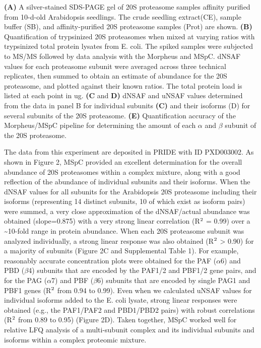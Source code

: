 \begin{FPfigure}
	{\textbf{(A)} A silver-stained SDS-PAGE gel of 20S proteasome samples affinity purified from 10-d-old Arabidopsis seedlings. The crude seedling extract(CE), sample buffer (SB), and affinity-purified 20S proteasome samples (Prot) are shown. \textbf{(B)} Quantification of trypsinized 20S proteasomes when mixed at varying ratios with trypsinized total protein lysates from E. coli. The spiked samples were subjected to MS/MS followed by data analysis with the Morpheus and MSpC. dNSAF values for each proteasome subunit were averaged across three technical replicates, then summed to obtain an estimate of abundance for the 20S proteasome, and plotted against their known ratios. The total protein load is listed at each point in ug. \textbf{(C} and \textbf{D)} dNSAF and uNSAF values determined from the data in panel B for individual subunits \textbf{(C)} and their isoforms {(D)} for several subunits of the 20S proteasome. \textbf{(E)} Quantification accuracy of the Morpheus/MSpC pipeline for determining the amount of each $\alpha$ and $\beta$ subunit of the 20S proteasome.}
	\label{fig:proteasomespike}
\end{FPfigure}
The data from this experiment are deposited in PRIDE with ID PXD003002.
As shown in Figure 2, MSpC provided an excellent determination for the overall abundance of 20S proteasomes within a complex mixture, along with a good reflection of the abundance of individual subunits and their isoforms.
When the dNSAF values for all subunits for the Arabidopsis 20S proteasome including their isoforms (representing 14 distinct subunits, 10 of which exist as isoform pairs) were summed, a very close approximation of the dNSAF/actual abundance was obtained (slope=0.875) with a very strong linear correlation (R$\textsuperscript{2}$ = 0.99) over a \textasciitilde10-fold range in protein abundance.  
When each 20S proteasome subunit was analyzed individually, a strong linear response was also obtained (R$\textsuperscript{2}$ > 0.90) for a majority of subunits (Figure 2C and Supplemental Table 1).
For example, reasonably accurate concentration plots were obtained for the PAF ($\alpha$6) and PBD ($\beta$4) subunits that are encoded by the PAF1/2 and PBF1/2 gene pairs, and for the PAG ($\alpha$7) and PBF ($\beta$6) subunits that are encoded by single PAG1 and PBF1 genes (R$\textsuperscript{2}$  from 0.94 to 0.99).
Even when we calculated uNSAF values for individual isoforms added to the E. coli lysate, strong linear responses were obtained (e.g., the PAF1/PAF2 and PBD1/PBD2 pairs) with robust correlations (R$\textsuperscript{2}$ from 0.89 to 0.95) (Figure 2D).
Taken together, MSpC worked well for relative LFQ analysis of a multi-subunit complex and its individual subunits and isoforms within a complex proteomic mixture.

